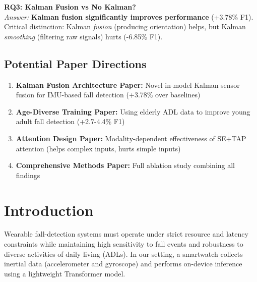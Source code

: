 \documentclass{article}
\begin{document}
\begin{tcolorbox}[colback=orange!5,colframe=orange!75!black]
\textbf{RQ3: Kalman Fusion vs No Kalman?}\\
\textit{Answer:} \textbf{Kalman fusion significantly improves performance} (+3.78\% F1). Critical distinction: Kalman \textit{fusion} (producing orientation) helps, but Kalman \textit{smoothing} (filtering raw signals) hurts (-6.85\% F1).
\end{tcolorbox}

\subsection*{Potential Paper Directions}

\begin{enumerate}
    \item \textbf{Kalman Fusion Architecture Paper:} Novel in-model Kalman sensor fusion for IMU-based fall detection (+3.78\% over baselines)
    \item \textbf{Age-Diverse Training Paper:} Using elderly ADL data to improve young adult fall detection (+2.7-4.4\% F1)
    \item \textbf{Attention Design Paper:} Modality-dependent effectiveness of SE+TAP attention (helps complex inputs, hurts simple inputs)
    \item \textbf{Comprehensive Methods Paper:} Full ablation study combining all findings
\end{enumerate}

\newpage

\tableofcontents
\newpage

\section{Introduction}

Wearable fall-detection systems must operate under strict resource and latency constraints while maintaining high sensitivity to fall events and robustness to diverse activities of daily living (ADLs). In our setting, a smartwatch collects inertial data (accelerometer and gyroscope) and performs on-device inference using a lightweight Transformer model.
\end{document}
